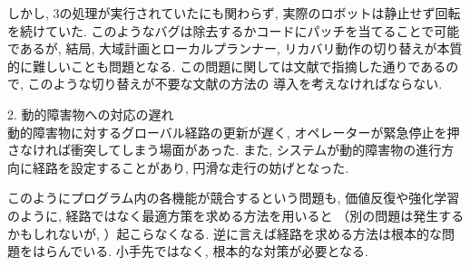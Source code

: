しかし, 3の処理が実行されていたにも関わらず, 
実際のロボットは静止せず回転を続けていた. 
このようなバグは除去するかコードにパッチを当てることで可能であるが, 
結局, 大域計画とローカルプランナー, 
リカバリ動作の切り替えが本質的に難しいことも問題となる. 
この問題に関しては文献\cite{ueda2023JRM}で指摘した通りであるので, 
このような切り替えが不要な文献\cite{ueda2023JRM}の方法の
導入を考えなければならない. 

2. 動的障害物への対応の遅れ\\
動的障害物に対するグローバル経路の更新が遅く, 
オペレーターが緊急停止を押さなければ衝突してしまう場面があった. 
また, システムが動的障害物の進行方向に経路を設定することがあり, 
円滑な走行の妨げとなった. 

このようにプログラム内の各機能が競合するという問題も, 
価値反復や強化学習のように, 
経路ではなく最適方策を求める方法を用いると
（別の問題は発生するかもしれないが, ）起こらなくなる. 
逆に言えば経路を求める方法は根本的な問題をはらんでいる. 
小手先ではなく, 根本的な対策が必要となる. 

